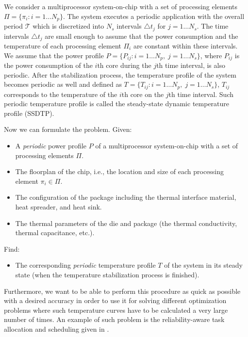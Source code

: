 We consider a multiprocessor system-on-chip with a set of processing elements $\Pi = \{ \pi_i: i = 1 \dots N_p \}$. The system executes a periodic application with the overall period $\mathcal{T}$ which is discretized into $N_s$ intervals $\triangle t_j$ for $j = 1 \dots N_s$. The time intervals $\triangle t_j$ are small enough to assume that the power consumption and the temperature of each processing element $\Pi_i$ are constant within these intervals. We assume that the power profile $P = \{ P_{ij}: i = 1 \dots N_p, \; j = 1 \dots N_s \}$, where $P_{ij}$ is the power consumption of the $i$th core during the $j$th time interval, is also periodic. After the stabilization process, the temperature profile of the system becomes periodic as well and defined as $T = \{ T_{ij}: i = 1 \dots N_p, \; j = 1 \dots N_s \}$, ${T_{ij}}$ corresponds to the temperature of the ${i}$th core on the $j$th time interval. Such periodic temperature profile is called the steady-state dynamic temperature profile (SSDTP).

Now we can formulate the problem. Given:
\begin{itemize}
  \item A \emph{periodic} power profile $P$ of a multiprocessor system-on-chip with a set of processing elements $\Pi$.
  \item The floorplan of the chip, i.e., the location and size of each processing element $\pi_i \in \Pi$.
  \item The configuration of the package including the thermal interface material, heat spreader, and heat sink.
  \item The thermal parameters of the die and package (the thermal conductivity, thermal capacitance, etc.).
\end{itemize}
Find:
\begin{itemize}
  \item The corresponding \emph{periodic} temperature profile $T$ of the system in its steady state (when the temperature stabilization process is finished).
\end{itemize}

Furthermore, we want to be able to perform this procedure as quick as possible with a desired accuracy in order to use it for solving different optimization problems where such temperature curves have to be calculated a very large number of times. An example of such problem is the reliability-aware task allocation and scheduling given in .

